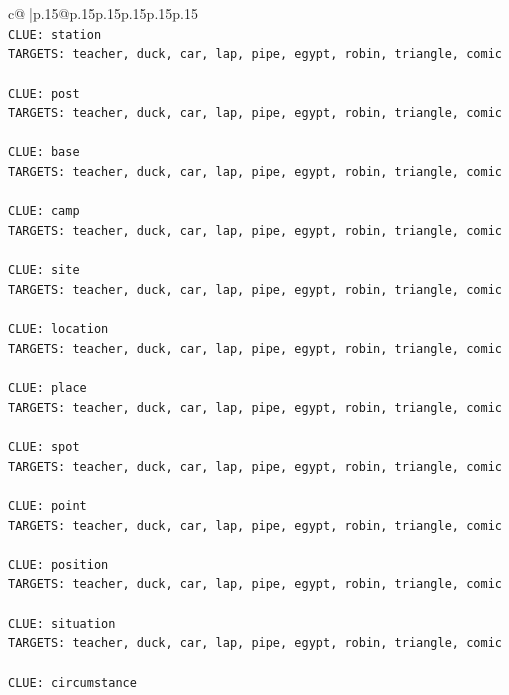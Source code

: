 \documentclass{article}
\begin{document}
{\begin{supertabular}{c@{$\;$}|p{.15\linewidth}@{}p{.15\linewidth}p{.15\linewidth}p{.15\linewidth}p{.15\linewidth}p{.15\linewidth}}
{{{\\ 
\texttt{CLUE: station} \\
\texttt{TARGETS: teacher, duck, car, lap, pipe, egypt, robin, triangle, comic} \\
\\ 
\texttt{CLUE: post} \\
\texttt{TARGETS: teacher, duck, car, lap, pipe, egypt, robin, triangle, comic} \\
\\ 
\texttt{CLUE: base} \\
\texttt{TARGETS: teacher, duck, car, lap, pipe, egypt, robin, triangle, comic} \\
\\ 
\texttt{CLUE: camp} \\
\texttt{TARGETS: teacher, duck, car, lap, pipe, egypt, robin, triangle, comic} \\
\\ 
\texttt{CLUE: site} \\
\texttt{TARGETS: teacher, duck, car, lap, pipe, egypt, robin, triangle, comic} \\
\\ 
\texttt{CLUE: location} \\
\texttt{TARGETS: teacher, duck, car, lap, pipe, egypt, robin, triangle, comic} \\
\\ 
\texttt{CLUE: place} \\
\texttt{TARGETS: teacher, duck, car, lap, pipe, egypt, robin, triangle, comic} \\
\\ 
\texttt{CLUE: spot} \\
\texttt{TARGETS: teacher, duck, car, lap, pipe, egypt, robin, triangle, comic} \\
\\ 
\texttt{CLUE: point} \\
\texttt{TARGETS: teacher, duck, car, lap, pipe, egypt, robin, triangle, comic} \\
\\ 
\texttt{CLUE: position} \\
\texttt{TARGETS: teacher, duck, car, lap, pipe, egypt, robin, triangle, comic} \\
\\ 
\texttt{CLUE: situation} \\
\texttt{TARGETS: teacher, duck, car, lap, pipe, egypt, robin, triangle, comic} \\
\\ 
\texttt{CLUE: circumstance} \\
}}}
\end{supertabular}}
\end{document}
